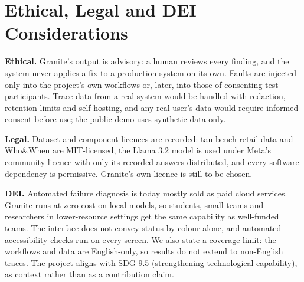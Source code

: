 \section{Ethical, Legal and DEI Considerations}

\textbf{Ethical.} Granite's output is advisory: a human reviews every finding, and the system never applies a fix to a production system on its own. Faults are injected only into the project's own workflows or, later, into those of consenting test participants. Trace data from a real system would be handled with redaction, retention limits and self-hosting, and any real user's data would require informed consent before use; the public demo uses synthetic data only.

\textbf{Legal.} Dataset and component licences are recorded: tau-bench retail data and Who\&When are MIT-licensed, the Llama 3.2 model is used under Meta's community licence with only its recorded answers distributed, and every software dependency is permissive. Granite's own licence is still to be chosen.

\textbf{DEI.} Automated failure diagnosis is today mostly sold as paid cloud services. Granite runs at zero cost on local models, so students, small teams and researchers in lower-resource settings get the same capability as well-funded teams. The interface does not convey status by colour alone, and automated accessibility checks run on every screen. We also state a coverage limit: the workflows and data are English-only, so results do not extend to non-English traces. The project aligns with SDG 9.5 (strengthening technological capability), as context rather than as a contribution claim.
